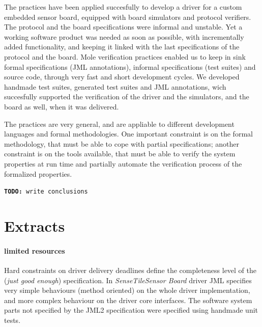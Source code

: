 \documentclass[english]{lni}
\newcommand{\todo}[1]{\texttt{\textbf{TODO:} #1}}
\newcommand{\ST}{\emph{SenseTile}\xspace}
\newcommand{\SB}{\emph{Sensor Board}\xspace}
\newcommand{\STSB}{\ST \SB\xspace}
\begin{document}
The practices have been applied succesfully to develop a driver for a custom embedded sensor board, equipped with board simulators and protocol verifiers. 
The protocol and the board specifications were informal and unstable. 
Yet a working software product was needed as soon as possible, with incrementally added functionality, and keeping it linked with the last specifications of the protocol and the board.
Mole verification practices enabled us to keep in sink formal specifications (JML annotations), informal specifications (test suites) and source code, through very fast and short development cycles.
We developed handmade test suites, generated test suites and JML annotations, wich succesfully supported the verification of the driver and the simulators, and the board as well, when it was delivered.

The practices are very general, and are appliable to different development languages and formal methodologies.
One important constraint is on the formal methodology, that must be able to cope with partial specifications; another constraint is on the tools available, that must be able to verify the system properties at run time and partially automate the verification process of the formalized properties.





\todo{write conclusions}

% 
% 


\newpage 

\section{Extracts}

\paragraph*{limited resources}

Hard constraints on driver delivery deadlines define the completeness level of the (\emph{just good enough}) specification.  
In \STSB driver JML specifies very simple behaviours (method oriented) on the whole driver implementation, and more complex behaviour on the driver core interfaces.  
The software system parts not specified by the JML2 specification were specified using handmade unit tests.
\end{document}
